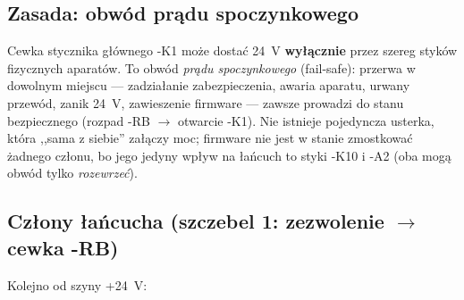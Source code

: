 \documentclass[11pt,a4paper]{article}
\begin{document}
\subsection{Zasada: obwód prądu spoczynkowego}
Cewka stycznika głównego -K1 może dostać 24~V \textbf{wyłącznie} przez szereg styków fizycznych
aparatów. To obwód \emph{prądu spoczynkowego} (fail-safe): przerwa w dowolnym miejscu ---
zadziałanie zabezpieczenia, awaria aparatu, urwany przewód, zanik 24~V, zawieszenie firmware ---
zawsze prowadzi do stanu bezpiecznego (rozpad -RB $\to$ otwarcie -K1). Nie istnieje pojedyncza
usterka, która ,,sama z siebie'' załączy moc; firmware nie jest w stanie zmostkować żadnego członu,
bo jego jedyny wpływ na łańcuch to styki -K10 i -A2 (oba mogą obwód tylko \emph{rozewrzeć}).

\subsection{Człony łańcucha (szczebel 1: zezwolenie $\to$ cewka -RB)}
Kolejno od szyny +24~V:
\end{document}

